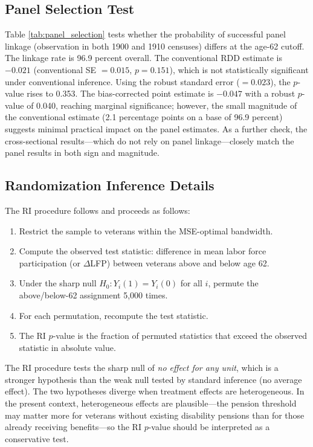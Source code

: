 \documentclass[12pt]{article}
\begin{document}
\subsection{Panel Selection Test}



Table \ref{tab:panel_selection} tests whether the probability of successful panel linkage (observation in both 1900 and 1910 censuses) differs at the age-62 cutoff. The linkage rate is 96.9 percent overall. The conventional RDD estimate is $-0.021$ (conventional SE $= 0.015$, $p = 0.151$), which is not statistically significant under conventional inference. Using the robust standard error ($= 0.023$), the $p$-value rises to 0.353. The bias-corrected point estimate is $-0.047$ with a robust $p$-value of 0.040, reaching marginal significance; however, the small magnitude of the conventional estimate (2.1 percentage points on a base of 96.9 percent) suggests minimal practical impact on the panel estimates. As a further check, the cross-sectional results---which do not rely on panel linkage---closely match the panel results in both sign and magnitude.

\subsection{Randomization Inference Details}

The RI procedure follows \citet{CattaneoFrandsenTitiunik2015} and proceeds as follows:

\begin{enumerate}
\item Restrict the sample to veterans within the MSE-optimal bandwidth.
\item Compute the observed test statistic: difference in mean labor force participation (or $\Delta$LFP) between veterans above and below age 62.
\item Under the sharp null $H_0: Y_i(1) = Y_i(0)$ for all $i$, permute the above/below-62 assignment 5,000 times.
\item For each permutation, recompute the test statistic.
\item The RI $p$-value is the fraction of permuted statistics that exceed the observed statistic in absolute value.
\end{enumerate}

The RI procedure tests the sharp null of \textit{no effect for any unit}, which is a stronger hypothesis than the weak null tested by standard inference (no average effect). The two hypotheses diverge when treatment effects are heterogeneous. In the present context, heterogeneous effects are plausible---the pension threshold may matter more for veterans without existing disability pensions than for those already receiving benefits---so the RI $p$-value should be interpreted as a conservative test.
\end{document}
